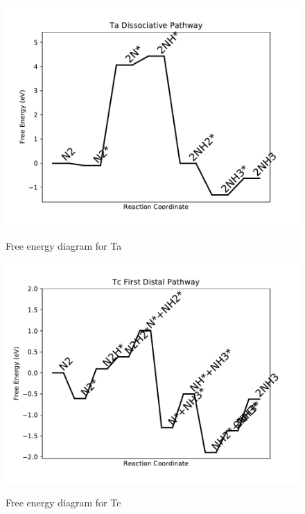 \documentclass{article}
\begin{document}
\newpage
\begin{figure}
\includegraphics[width=1\linewidth]{data/plots/Ta_dissociative.pdf}
\label{fig:Ta_dissociative}
\caption{Free energy diagram for Ta}
\end{figure}

\begin{figure}
\includegraphics[width=1\linewidth]{data/plots/Tc_distal_1.pdf}
\label{fig:Tc_distal_1}
\caption{Free energy diagram for Tc}
\end{figure}
\end{document}
